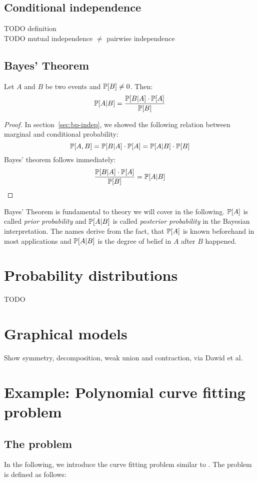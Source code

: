 \subsection{Conditional independence}
\label{sec:bp-cond-indep}
%
TODO definition \\
TODO mutual independence $\neq$ pairwise independence

\subsection{Bayes' Theorem}
\label{sec:bp-bayes}
%
\begin{theorem}
  Let $A$ and $B$ be two events and $\mathbb P[B] \neq 0$. Then:
  \[ \mathbb P[A|B] = \frac{\mathbb P[B|A] \cdot \mathbb P[A]}{\mathbb P[B]} \]
\end{theorem}
\begin{proof}
  In section~\ref{sec:bp-indep}, we showed the following relation between marginal and conditional probability:
  \[ \mathbb P[A,B] = \mathbb P[B|A] \cdot \mathbb P[A] = \mathbb P[A|B] \cdot \mathbb P[B] \]
  Bayes' theorem follows immediately:
  \[ \frac{\mathbb P[B|A] \cdot \mathbb P[A]}{\mathbb P[B]} = \mathbb P[A|B] \]
\end{proof}

Bayes' Theorem is fundamental to theory we will cover in the following.
$\mathbb P[A]$ is called \emph{prior probability} and $\mathbb P[A|B]$ is called \emph{posterior probability} in the Bayesian interpretation.
The names derive from the fact, that $\mathbb P[A]$ is known beforehand in most applications and $\mathbb P[A|B]$ is the degree of belief in $A$ after $B$ happened.

\section{Probability distributions}
\label{sec:bp-dist}
%
TODO

\section{Graphical models}
\label{sec:bp-graphical-models}
%
Show symmetry, decomposition, weak union and contraction, via Dawid et al.

\section{Example: Polynomial curve fitting problem}
\label{sec:bp-curve-fitting}
%
\subsection{The problem}
%
In the following, we introduce the curve fitting problem similar to \cite[p.~4~ff.]{Bishop}.
The problem is defined as follows:


